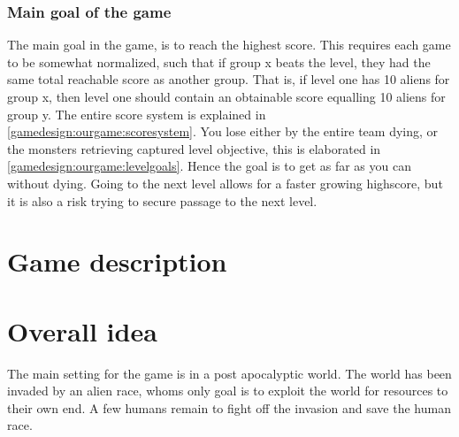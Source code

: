 
\subsubsection{Main goal of the game}
The main goal in the game, is to reach the highest score. This requires each game to be somewhat normalized, such that if group x beats the level, they had the same total reachable score as another group. That is, if level one has 10 aliens for group x, then level one should contain an obtainable score equalling 10 aliens for group y. The entire score system is explained in \ref{gamedesign:ourgame:scoresystem}. You lose either by the entire team dying, or the monsters retrieving captured level objective, this is elaborated in \ref{gamedesign:ourgame:levelgoals}. Hence the goal is to get as far as you can without dying. Going to the next level allows for a faster growing highscore, but it is also a risk trying to secure passage to the next level.

\section{Game description}


\section{Overall idea}
The main setting for the game is in a post apocalyptic world.
The world has been invaded by an alien race, whoms only goal is to exploit the world for resources to their own end. 
A few humans remain to fight off the invasion and save the human race. 

